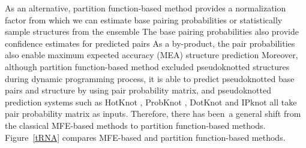 As an alternative, partition function-based method provides a normalization factor from which we can estimate base pairing probabilities 
\cite{mccaskill:1990, mathews:2004}%
 or statistically sample structures from the ensemble 
 \cite{ding+:2005, mathews:2006}%
The base pairing probabilities also provide confidence estimates for predicted pairs 
\cite{mathews:2004, Zuber+:2018}%
As a by-product, the pair probabilities also enable maximum expected accuracy (MEA) structure prediction 
\cite{do+:2006, lu+:2009}%
Moreover, although partition function-based method excluded pseudoknotted structures during dynamic programming process, 
it is able to predict pseudoknotted base pairs and structure by using pair probability matrix, and pseudoknotted prediction systems such as HotKnot \cite{Ren+:2005}, ProbKnot \cite{bellaousov+mathews:2010}, DotKnot \cite{Sperschneider+Datta:2010} and IPknot \cite{Sato+:2011} all take pair probability matrix as inputs. 
Therefore, there has been a general shift from the classical MFE-based methods to partition function-based methods. 
Figure~\ref{tRNA} compares MFE-based and partition function-based methods.

